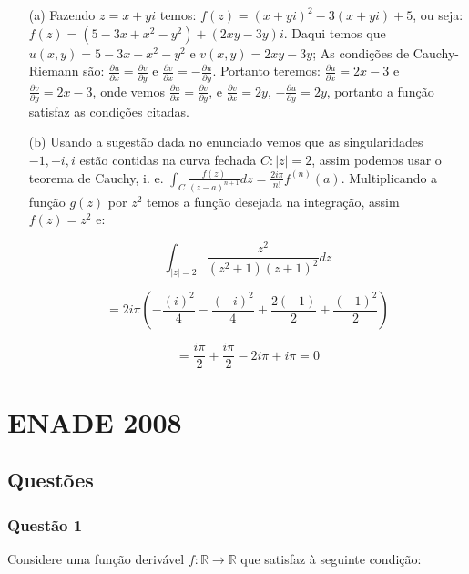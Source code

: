 \documentclass{report}
\begin{document}
\begin{enumerate}

\item[(a)] Fazendo $z=x+yi$ temos: $f(z)=(x+yi)^2-3(x+yi)+5$, ou seja: $f(z)=(5-3x+x^2-y^2)+(2xy-3y)i$. Daqui temos que $u(x,y)=5-3x+x^2-y^2$ e $v(x,y)=2xy-3y$; As condi\c c\~oes de Cauchy-Riemann s\~ao: $\displaystyle \frac{\partial u}{\partial x}=\frac{\partial v}{\partial y}$ e $\displaystyle \frac{\partial v}{\partial x}=-\frac{\partial u}{\partial y}$. Portanto teremos: $\displaystyle \frac{\partial u}{\partial x}=2x-3$ e $\displaystyle \frac{\partial v}{\partial y}=2x-3$, onde vemos $\displaystyle \frac{\partial u}{\partial x}=\frac{\partial v}{\partial y}$, e $\displaystyle \frac{\partial v}{\partial x}=2y$, $\displaystyle-\frac{\partial u}{\partial y}=2y$, portanto a fun\c c\~ao satisfaz as condi\c c\~oes citadas.

\item[(b)] Usando a sugest\~ao dada no enunciado vemos que as singularidades $-1, -i, i$ est\~ao contidas na curva fechada $C:|z|=2$, assim podemos usar o teorema de Cauchy, i. e. $\displaystyle \int_C \frac{f(z)}{(z-a)^{n+1}} dz=\frac{2i\pi}{ n!}f^{(n)}(a)$. Multiplicando a fun\c c\~ao $g(z)$ por $z^2$ temos a fun\c c\~ao desejada na integra\c c\~ao, assim $f(z)=z^2$ e: 

$$\int_{|z|=2}\frac{z^2}{(z^2+1)(z+1)^2}dz$$

$$=2i\pi\left(-\frac{(i)^2}{4}-\frac{(-i)^2}{4}+\frac{2(-1)}{2}+\frac{(-1)^2}{2}\right)$$

$$=\frac{i\pi}{2}+\frac{i\pi}{2}-2i\pi+i\pi=0$$

\end{enumerate}

\chapter{ENADE 2008}

\section{\color{blue} Quest\~oes}

\subsection{\color{blue} Quest\~ao 1}

Considere uma fun\c c\~ao deriv\'avel $f: \mathbb{R} \to \mathbb{R}$ que satisfaz \`a seguinte condi\c c\~ao:
\end{document}

